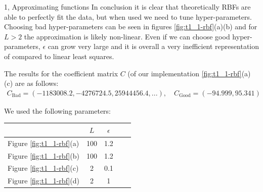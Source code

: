 \begin{task}{1, Approximating functions}
In conclusion it is clear that theoretically RBFs are able to perfectly fit the data, but when used we need to tune hyper-parameters. Choosing bad hyper-parameters can be seen in figures \ref{fig:t1_1-rbf}(a)(b) and for $L>2$ the approximation is likely non-linear. Even if we can choose good hyper-parameters, $\epsilon$ can grow very large and it is overall a very inefficient representation of compared to linear least squares.\\


\begin{minipage}{\linewidth}%
The results for the coefficient matrix $C$ (of our implementation \ref{fig:t1_1-rbf}(a)(c) are as follows:
\begin{align*}
    C_{\text{Bad}}=(-1183008.2, -4276724.5, 25944456.4, ...),\quad C_{\text{Good}}=(-94.999,  95.341)
\end{align*}

We used the following parameters:
\begin{center}
    \bgroup
    \def\arraystretch{1.5}
    \begin{tabular}{ |l|c|c|c|c| }
    \hline
    & $L$ & $\epsilon$\\
    \hline
    Figure \ref{fig:t1_1-rbf}(a) & 100 & 1.2\\
    \hline
    Figure \ref{fig:t1_1-rbf}(b) & 100 & 1.2\\
    \hline
    Figure \ref{fig:t1_1-rbf}(c) & 2 & 0.1\\
    \hline
    Figure \ref{fig:t1_1-rbf}(d) & 2 & 1\\
    \hline
    \end{tabular}
    \egroup
\end{center}
\end{minipage}


\end{task}
